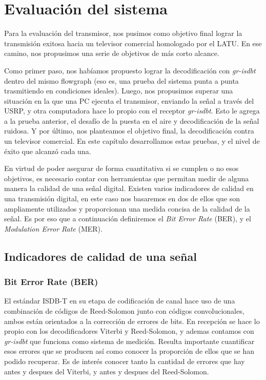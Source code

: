 \chapter{Evaluación del sistema}

Para la evaluación del transmisor, nos pusimos como objetivo final lograr la transmisión exitosa hacia un televisor comercial homologado por el LATU. En ese camino, nos propusimos una serie de objetivos de más corto alcance. 

Como primer paso, nos habíamos propuesto lograr la decodificación con \textit{gr-isdbt} dentro del mismo flowgraph (eso es, una prueba del sistema punta a punta trasmitiendo en condiciones ideales). Luego, nos propusimos superar una situación en la que una PC ejecuta el transmisor, enviando la señal a través del USRP, y otra computadora hace lo propio con el receptor \textit{gr-isdbt}. Esto le agrega a la prueba anterior, el desafío de la puesta en el aire y decodificación de la señal ruidosa. Y por último, nos planteamos el objetivo final, la decodificación contra un televisor comercial. En este capítulo desarrollamos estas pruebas, y el nivel de éxito que alcanzó cada una.

En virtud de poder asegurar de forma cuantitativa si se cumplen o no esos objetivos, es necesario contar con herramientas que permitan medir de alguna manera la calidad de una señal digital. Existen varios indicadores de calidad en una transmisión digital, en este caso nos basaremos en dos de ellos que son ampliamente utilizados y proporcionan una medida concisa de la calidad de la señal. Es por eso que a continuación definiremos el \textit{Bit Error Rate} (\gls{BER}), y el \textit{Modulation Error Rate} (\gls{MER}).

\section{Indicadores de calidad de una señal}
\subsection{Bit Error Rate (BER)}
El estándar ISDB-T en su etapa de codificación de canal hace uso de una combinación de códigos de Reed-Solomon junto con códigos convolucionales, ambos están orientados a la corrección de errores de bits. En recepción se hace lo propio con los decodificadores Viterbi y Reed-Solomon, y ademas contamos con \textit{gr-isdbt} que funciona como sistema de medición. Resulta importante cuantificar esos errores que se producen así como conocer la proporción de ellos que se han podido recuperar. Es de interés conocer tanto la cantidad de errores que hay antes y despues del Viterbi, y antes y despues del Reed-Solomon.

